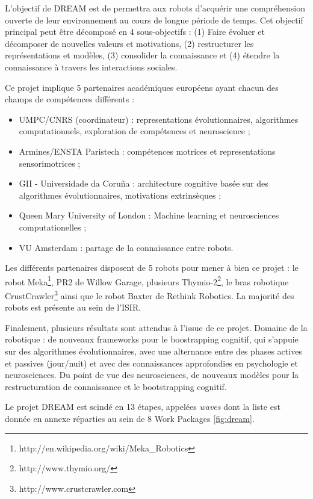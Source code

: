 \documentclass[draft]{llncs}
\begin{document}
L'objectif de DREAM est de permettra aux robots d'acquérir une compréhension ouverte de leur environnement au cours de longue période de temps.
Cet objectif principal peut être décomposé en 4 sous-objectifs : (1) Faire évoluer et décomposer de nouvelles valeurs et motivations, (2) restructurer les représentations et modèles, (3) consolider la connaissance et (4) étendre la connaissance à travers les interactions sociales.

Ce projet implique 5 partenaires académiques européens ayant chacun des champs de compétences différents : 

\begin{itemize}
  \item UMPC/CNRS (coordinateur) : representations évolutionnaires, algorithmes computationnels, exploration de compétences et neuroscience ;
  \item Armines/ENSTA Paristech : compétences motrices et representations sensorimotrices ;
  \item GII - Universidade da Coruña :  architecture cognitive basée sur des algorithmes évolutionnaires, motivations extrinsèques ;
  \item Queen Mary University of London : Machine learning et neurosciences computationelles ;
  \item VU Amsterdam : partage de la connaissance entre robots.
\end{itemize}

Les différents partenaires disposent de 5 robots pour mener à bien ce projet : le robot Meka\footnote{http://en.wikipedia.org/wiki/Meka\_Robotics}, PR2 de Willow Garage, plusieurs Thymio-2\footnote{http://www.thymio.org/}, le bras robotique CrustCrawler\footnote{http://www.crustcrawler.com} ainsi que le robot Baxter de Rethink Robotics. La majorité des robots est présente au sein de l'ISIR.

Finalement, plusieurs résultats sont attendus à l'issue de ce projet.
Domaine de la robotique : de nouveaux frameworks pour le boostrapping cognitif, qui s'appuie sur des algorithmes évolutionnaires, avec une alternance entre des phases actives et passives (jour/nuit) et avec des connaissances approfondies en psychologie et neurosciences.
Du point de vue des neurosciences, de nouveaux modèles pour la restructuration de connaissance et le bootstrapping cognitif.

Le projet DREAM est scindé en 13 étapes, appelées \textit{waves} dont la liste est donnée en annexe réparties au sein de 8 Work Packages \ref{fig:dream}.
\end{document}

